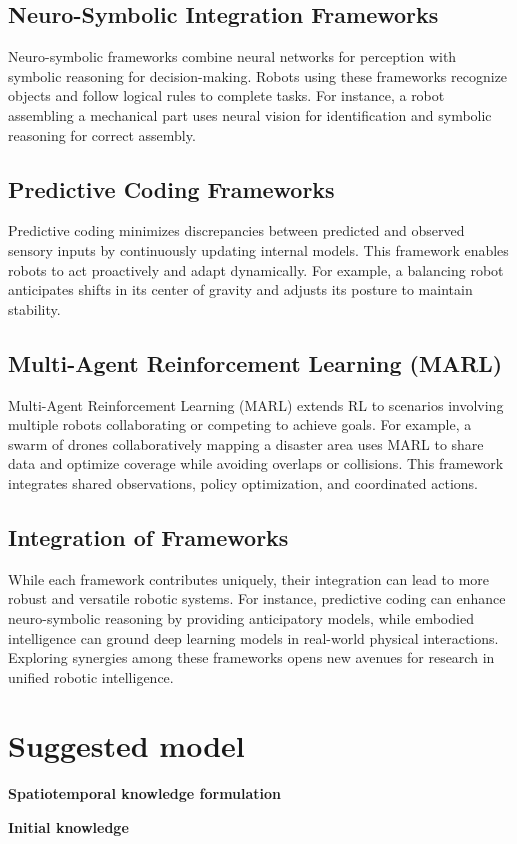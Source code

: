     \subsection{Neuro-Symbolic Integration Frameworks}
    Neuro-symbolic frameworks combine neural networks for perception with symbolic reasoning for decision-making. Robots using these frameworks recognize objects and follow logical rules to complete tasks. For instance, a robot assembling a mechanical part uses neural vision for identification and symbolic reasoning for correct assembly. \cite{garcez-2019-neuro-symbolic}
    
    \subsection{Predictive Coding Frameworks}
    Predictive coding minimizes discrepancies between predicted and observed sensory inputs by continuously updating internal models. This framework enables robots to act proactively and adapt dynamically. For example, a balancing robot anticipates shifts in its center of gravity and adjusts its posture to maintain stability. \cite{rao-1999-predictive-coding}
    
    \subsection{Multi-Agent Reinforcement Learning (MARL)}
    Multi-Agent Reinforcement Learning (MARL) extends RL to scenarios involving multiple robots collaborating or competing to achieve goals. For example, a swarm of drones collaboratively mapping a disaster area uses MARL to share data and optimize coverage while avoiding overlaps or collisions. This framework integrates shared observations, policy optimization, and coordinated actions. \cite{busoniu-2008-marl}
    
    \subsection{Integration of Frameworks}
    While each framework contributes uniquely, their integration can lead to more robust and versatile robotic systems. For instance, predictive coding can enhance neuro-symbolic reasoning by providing anticipatory models, while embodied intelligence can ground deep learning models in real-world physical interactions. Exploring synergies among these frameworks opens new avenues for research in unified robotic intelligence.

\section{Suggested model}
    \textbf{Spatiotemporal knowledge formulation}

    \textbf{Initial knowledge}

    \textbf{}
    
